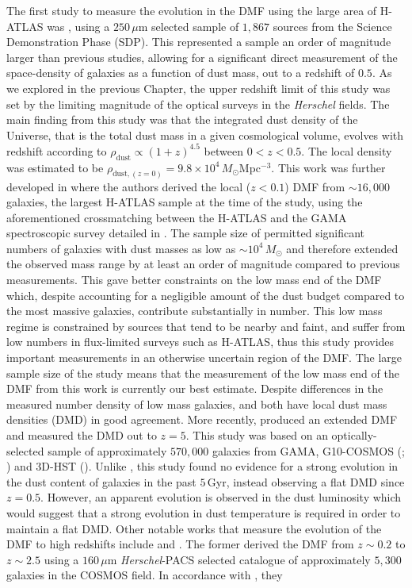The first study to measure the evolution in the DMF using the large area of H-ATLAS was \citealt{Dunne_2011}, using a $250\,\mu$m selected sample of $1,867$ sources from the Science Demonstration Phase (SDP). This represented a sample an order of magnitude larger than previous studies, allowing for a significant direct measurement of the space-density of galaxies as a function of dust mass, out to a redshift of $0.5$. As we explored in the previous Chapter, the upper redshift limit of this study was set by the limiting magnitude of the optical surveys in the \textit{Herschel} fields. The main finding from this study was that the integrated dust density of the Universe, that is the total dust mass in a given cosmological volume, evolves with redshift according to $\rho_{\textrm{dust}} \propto (1+z)^{4.5}$ between $0 < z < 0.5$. The local density was estimated to be $\rho_{\textrm{dust}, (z=0)} = 9.8\times10^4$\,$M_\odot$Mpc$^{-3}$. This work was further developed in \citealt{Beeston_2018} where the authors derived the local ($z < 0.1$) DMF from $\sim 16,000$ galaxies, the largest H-ATLAS sample at the time of the study, using the aforementioned crossmatching between the H-ATLAS and the GAMA spectroscopic survey detailed in \citealt{Bourne_2016}. The sample size of \citealt{Beeston_2018} permitted significant numbers of galaxies with dust masses as low as $\sim 10^4\,M_\odot$ and therefore extended the observed mass range by at least an order of magnitude compared to previous measurements. This gave better constraints on the low mass end of the DMF which, despite accounting for a negligible amount of the dust budget compared to the most massive galaxies, contribute substantially in number. This low mass regime is constrained by sources that tend to be nearby and faint, and suffer from low numbers in flux-limited surveys such as H-ATLAS, thus this study provides important measurements in an otherwise uncertain region of the DMF. The large sample size of the \citealt{Beeston_2018} study means that the measurement of the low mass end of the DMF from this work is currently our best estimate. Despite differences in the measured number density of low mass galaxies, \citealt{Dunne_2011} and \citealt{Beeston_2018} both have local dust mass densities (DMD) in good agreement. More recently, \citealt{Driver_2018} produced an extended DMF and measured the DMD out to $z = 5$. This study was based on an optically-selected sample of approximately $570,000$ galaxies from GAMA, G10-COSMOS (\citealt{Davies_2015}; \citealt{Andrews_2017}) and 3D-HST (\citealt{Brammer_2012, Momcheva_2016}). Unlike \citealt{Dunne_2011}, this study found no evidence for a strong evolution in the dust content of galaxies in the past $5\,$Gyr, instead observing a flat DMD since $z = 0.5$. However, an apparent evolution is observed in the dust luminosity which would suggest that a strong evolution in dust temperature is required in order to maintain a flat DMD. Other notable works that measure the evolution of the DMF to high redshifts include \citealt{Pozzi_2020} and \citealt{Dudzeviciute_2021}. The former derived the DMF from $z \sim 0.2$ to $z \sim 2.5$ using a $160\,\mu$m \textit{Herschel}-PACS selected catalogue of approximately $5,300$ galaxies in the COSMOS field. In accordance with \citealt{Driver_2018}, they 